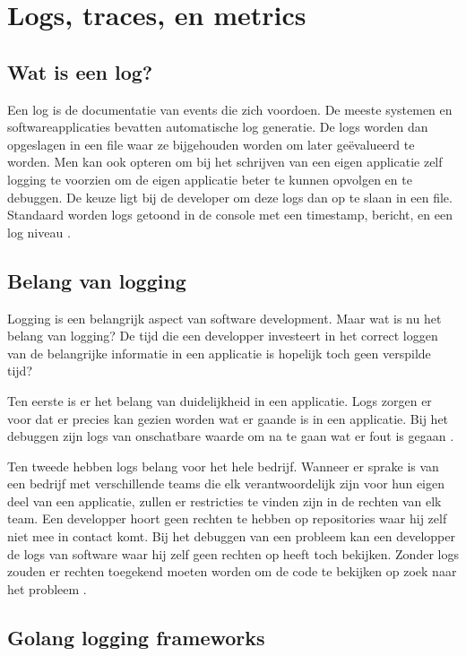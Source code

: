 \section{Logs, traces, en metrics}
\label{sec:log}

\subsection{Wat is een log?}

Een log is de documentatie van events die zich voordoen. De meeste systemen en softwareapplicaties bevatten automatische log generatie. De logs worden dan opgeslagen in een file waar ze bijgehouden worden om later geëvalueerd te worden. Men kan ook opteren om bij het schrijven van een eigen applicatie zelf logging te voorzien om de eigen applicatie beter te kunnen opvolgen en te debuggen. De keuze ligt bij de developer om deze logs dan op te slaan in een file. Standaard worden logs getoond in de console met een timestamp, bericht, en een log niveau \autocite{Techopedia}.

\subsection{Belang van logging}

Logging is een belangrijk aspect van software development. Maar wat is nu het belang van logging? De tijd die een developper investeert in het correct loggen van de belangrijke informatie in een applicatie is hopelijk toch geen verspilde tijd? 

Ten eerste is er het belang van duidelijkheid in een applicatie. Logs zorgen er voor dat er precies kan gezien worden wat er gaande is in een applicatie. Bij het debuggen zijn logs van onschatbare waarde om na te gaan wat er fout is gegaan \autocite{logdna2018}.

Ten tweede hebben logs belang voor het hele bedrijf. Wanneer er sprake is van een bedrijf met verschillende teams die elk verantwoordelijk zijn voor hun eigen deel van een applicatie, zullen er restricties te vinden zijn in de rechten van elk team. Een developper hoort geen rechten te hebben op repositories waar hij zelf niet mee in contact komt. Bij het debuggen van een probleem kan een developper de logs van software waar hij zelf geen rechten op heeft toch bekijken. Zonder logs zouden er rechten toegekend moeten worden om de code te bekijken op zoek naar het probleem \autocite{czanik2013}.

\subsection{Golang logging frameworks}

